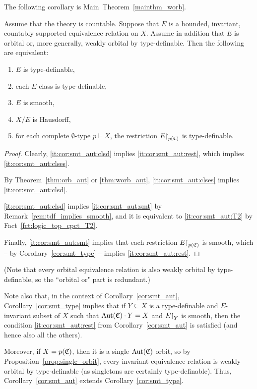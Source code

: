 	The following corollary is Main~Theorem~\ref{mainthm_worb}.
	
	\begin{cor}
		\label{cor:smt_aut}
		Assume that the theory is countable. Suppose that $E$ is a bounded, invariant, countably supported equivalence relation on $X$. Assume in addition that $E$ is orbital or, more generally, weakly orbital by type-definable. Then the following are equivalent:
		\begin{enumerate}
			\item
			\label{it:cor:smt_aut:clsd}
			$E$ is type-definable,
			\item
			\label{it:cor:smt_aut:clses}
			each $E$-class is type-definable,
			\item
			\label{it:cor:smt_aut:smt}
			$E$ is smooth,
			\item
			\label{it:cor:smt_aut:T2}
			$X/E$ is Hausdorff,
			\item
			\label{it:cor:smt_aut:rest}
			for each complete $\emptyset$-type $p\vdash X$, the restriction $E\mathord{\upharpoonright}_{p({\mathfrak C})}$ is type-definable.
		\end{enumerate}
	\end{cor}
	\begin{proof}
		Clearly, \ref{it:cor:smt_aut:clsd} implies \ref{it:cor:smt_aut:rest}, which implies \ref{it:cor:smt_aut:clses}.
		
		By Theorem~\ref{thm:orb_aut} or \ref{thm:worb_aut}, \ref{it:cor:smt_aut:clses} implies \ref{it:cor:smt_aut:clsd}.
		
		\ref{it:cor:smt_aut:clsd} implies \ref{it:cor:smt_aut:smt} by Remark~\ref{rem:tdf_implies_smooth}, and it is equivalent to \ref{it:cor:smt_aut:T2} by Fact~\ref{fct:logic_top_cpct_T2}.
		
		Finally, \ref{it:cor:smt_aut:smt} implies that each restriction $E\mathord{\upharpoonright}_{p({\mathfrak C})}$ is smooth, which -- by Corollary~\ref{cor:smt_type} -- implies \ref{it:cor:smt_aut:rest}.
	\end{proof}
	(Note that every orbital equivalence relation is also weakly orbital by type-definable, so the ``orbital or" part is redundant.)
	
	\begin{rem}
		Note also that, in the context of Corollary~\ref{cor:smt_aut}, Corollary~\ref{cor:smt_type} implies that if $Y\subseteq X$ is a type-definable and $E$-invariant subset of $X$ such that $\operatorname{{Aut}}({\mathfrak C})\cdot Y=X$ and $E\mathord{\upharpoonright}_Y$ is smooth, then the condition \ref{it:cor:smt_aut:rest} from Corollary~\ref{cor:smt_aut} is satisfied (and hence also all the others).
		
		Moreover, if $X=p({\mathfrak C})$, then it is a single $\operatorname{{Aut}}({\mathfrak C})$ orbit, so by Proposition~\ref{prop:single_orbit}, every invariant equivalence relation is weakly orbital by type-definable (as singletons are certainly type-definable). Thus, Corollary~\ref{cor:smt_aut} extends Corollary~\ref{cor:smt_type}.\xqed{\lozenge}
	\end{rem}
	
	
